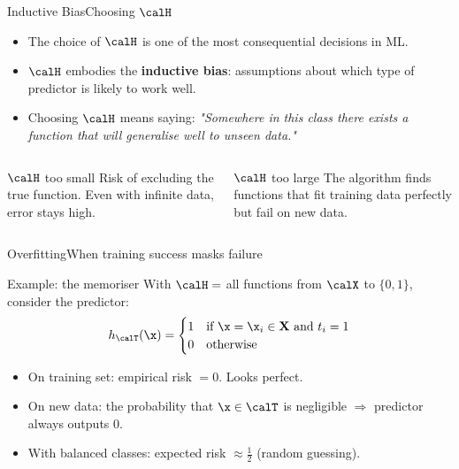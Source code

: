 \begin{frame}{Inductive Bias}{Choosing $\calH$}
  \begin{itemize}
    \item The choice of $\calH$ is one of the most consequential decisions in ML.
    \item $\calH$ embodies the
          \textcolor{AccentBlue}{\textbf{inductive bias}}: assumptions about which type of
          predictor is likely to work well.
    \item Choosing $\calH$ means saying: \textit{"Somewhere in this class there exists a
          function that will generalise well to unseen data."}
  \end{itemize}
  \bigskip
  \begin{columns}[T]
    \begin{alertblock}{$\calH$ too small}
      Risk of excluding the true function. Even with infinite data, error stays high.
    \end{alertblock}
    \begin{alertblock}{$\calH$ too large}
      The algorithm finds functions that fit training data perfectly but fail on new data.
    \end{alertblock}
  \end{columns}
\end{frame}

\begin{frame}{Overfitting}{When training success masks failure}
  \begin{exampleblock}{Example: the memoriser}
    With $\calH = $ all functions from $\calX$ to $\{0,1\}$, consider the predictor:
    \[
      h_\calT(\x) =
      \begin{cases}
        1 & \text{if } \x = \x_i \in \mathbf{X} \text{ and } t_i = 1\\
        0 & \text{otherwise}
      \end{cases}
    \]
  \end{exampleblock}
  \begin{itemize}
    \item On training set: empirical risk $= 0$. Looks perfect.
    \item On new data: the probability that $\x \in \calT$ is negligible $\Rightarrow$
          predictor always outputs 0.
    \item With balanced classes: expected risk $\approx \tfrac{1}{2}$ (random guessing).
  \end{itemize}
\end{frame}

